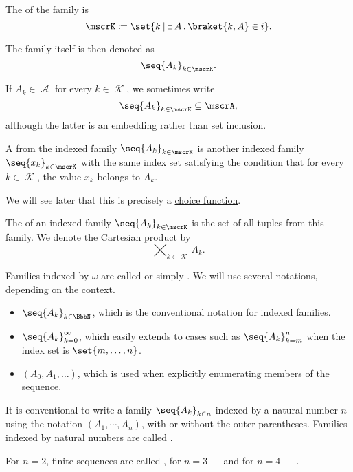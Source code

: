 \begin{definition}
\begin{thmenum}
    The  of the family is
    \begin{equation*}
      \mscrK \coloneqq \set{ k \given \qexists A \braket{ k, A } \in i }.
    \end{equation*}

    The family itself is then denoted as
    \begin{equation*}
      \seq{ A_k }_{k \in \mscrK}.
    \end{equation*}

    If \( A_k \in \mscrA \) for every \( k \in \mscrK \), we sometimes write
    \begin{equation*}
      \seq{ A_k }_{k \in \mscrK} \subseteq \mscrA,
    \end{equation*}
    although the latter is an embedding rather than set inclusion.

     A  from the indexed family \( \seq{ A_k }_{k \in \mscrK} \) is another indexed family \( \seq{ x_k }_{k \in \mscrK} \) with the same index set satisfying the condition that for every \( k \in \mscrK \), the value \( x_k \) belongs to \( A_k \).

    We will see later that this is precisely a \hyperref[def:choice_function]{choice function}.

     The  of an indexed family \( \seq{ A_k }_{k \in \mscrK} \) is the set of all tuples from this family. We denote the Cartesian product by
    \begin{equation*}
      \bigtimes_{k \in \mscrK} A_k.
    \end{equation*}
  \end{thmenum}
\end{definition}

\begin{definition}\label{def:sequence}
  Families indexed by \( \omega \) are called  or simply . We will use several notations, depending on the context.
  \begin{itemize}
    \item \( \seq{ A_k }_{k \in \BbbN} \), which is the conventional notation for indexed families.
    \item \( \seq{ A_k }_{k=0}^\infty \), which easily extends to cases such as \( \seq{ A_k }_{k=m}^n \) when the index set is \( \set{ m, \ldots, n } \).
    \item \( (A_0, A_1, \ldots) \), which is used when explicitly enumerating members of the sequence.
  \end{itemize}

  It is conventional to write a family \( \seq{ A_k }_{k \in n} \) indexed by a natural number \( n \) using the notation \( (A_1, \cdots, A_n) \), with or without the outer parentheses. Families indexed by natural numbers are called .

  For \( n = 2 \), finite sequences are called , for \( n = 3 \) ---  and for \( n = 4 \) --- .
\end{definition}

